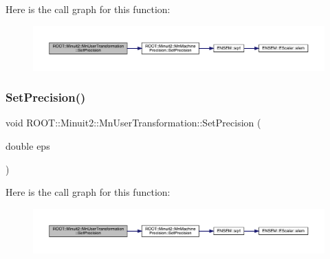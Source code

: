 Here is the call graph for this function\+:
\nopagebreak
\begin{figure}[H]
\begin{center}
\leavevmode
\includegraphics[width=350pt]{d9/d98/classROOT_1_1Minuit2_1_1MnUserTransformation_aa80f289974f19753a2912a8eb6311f53_cgraph}
\end{center}
\end{figure}
\mbox{\label{classROOT_1_1Minuit2_1_1MnUserTransformation_aa80f289974f19753a2912a8eb6311f53}} 
\subsubsection{\texorpdfstring{SetPrecision()}{SetPrecision()}\hspace{0.1cm}{\footnotesize\ttfamily [2/3]}}
{\footnotesize\ttfamily void R\+O\+O\+T\+::\+Minuit2\+::\+Mn\+User\+Transformation\+::\+Set\+Precision (\begin{DoxyParamCaption}\item[{double}]{eps }\end{DoxyParamCaption})\hspace{0.3cm}{\ttfamily [inline]}}

Here is the call graph for this function\+:
\nopagebreak
\begin{figure}[H]
\begin{center}
\leavevmode
\includegraphics[width=350pt]{d9/d98/classROOT_1_1Minuit2_1_1MnUserTransformation_aa80f289974f19753a2912a8eb6311f53_cgraph}
\end{center}
\end{figure}
\mbox{\label{classROOT_1_1Minuit2_1_1MnUserTransformation_aa80f289974f19753a2912a8eb6311f53}} 
